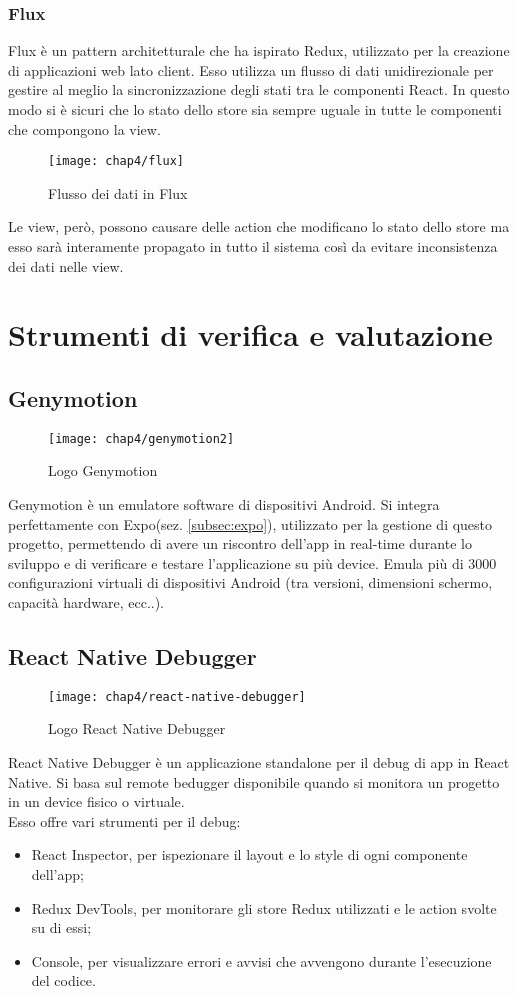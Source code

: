 \subsubsection{Flux}
 Flux è un pattern architetturale che ha ispirato Redux, utilizzato per la creazione di applicazioni web lato client. Esso utilizza un flusso di dati unidirezionale per gestire al meglio la sincronizzazione degli stati tra le componenti React. In questo modo si è sicuri che lo stato dello store sia sempre uguale in tutte le componenti che compongono la view.
 \begin{figure}[H] 
 	\centering
 	\texttt{[image: chap4/flux]}
 	\caption{Flusso dei dati in Flux}
 \end{figure}
 Le view, però, possono causare delle action che modificano lo stato dello store ma esso sarà interamente propagato in tutto il sistema così da evitare inconsistenza dei dati nelle view.
 
\section{Strumenti di verifica e valutazione}

\subsection{Genymotion}
\begin{figure}[H] 
	\centering
	\texttt{[image: chap4/genymotion2]}
	\caption{Logo Genymotion}
\end{figure}
Genymotion è un emulatore software di dispositivi Android. Si integra perfettamente con Expo(sez. \ref{subsec:expo}), utilizzato per la gestione di questo progetto, permettendo di avere un riscontro dell'app in real-time durante lo sviluppo e di verificare e testare l'applicazione su più device. Emula più di 3000 configurazioni virtuali di dispositivi Android (tra versioni, dimensioni schermo, capacità hardware, ecc..). 

\subsection{React Native Debugger}
\begin{figure}[H] 
	\centering
	\texttt{[image: chap4/react-native-debugger]}
	\caption{Logo React Native Debugger}
\end{figure}
React Native Debugger è un applicazione standalone per il debug di app in React Native. Si basa sul remote bedugger disponibile quando si monitora un progetto in un device fisico o virtuale.\\ Esso offre vari strumenti per il debug:
\begin{itemize}
	\item React Inspector, per ispezionare il layout e lo style di ogni componente dell'app;
	\item Redux DevTools, per monitorare gli store Redux utilizzati e le action svolte su di essi;
	\item Console, per visualizzare errori e avvisi che avvengono durante l'esecuzione del codice.
\end{itemize}

